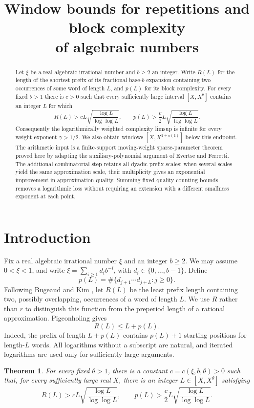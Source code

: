 \documentclass[11pt]{article}
\title{Window bounds for repetitions and block complexity\\of algebraic numbers}
\author{}\date{}
\numberwithin{equation}{section}
\newtheorem{theorem}{Theorem}[section]
\theoremstyle{remark}\newtheorem{remark}[theorem]{Remark}
\begin{document}
\maketitle
\begin{abstract}
Let $\xi$ be a real algebraic irrational number and $b\ge2$ an integer.
Write $R(L)$ for the length of the shortest prefix of its fractional
base-$b$ expansion containing two occurrences of some word of length $L$,
and $p(L)$ for its block complexity. For every fixed $\theta>1$ there is
$c>0$ such that every sufficiently large interval $[X,X^\theta]$ contains
an integer $L$ for which
\[
 R(L)>cL\sqrt{\frac{\log L}{\log\log L}},\qquad
 p(L)>\frac c2L\sqrt{\frac{\log L}{\log\log L}}.
\]
Consequently the logarithmically weighted complexity limsup is infinite
for every weight exponent $\gamma>1/2$. We also obtain windows
$[X,X^{1+o(1)}]$ below this endpoint. The arithmetic input is a
finite-support moving-weight sparse-parameter theorem proved here by
adapting the auxiliary-polynomial argument of Evertse and Ferretti.
The additional combinatorial step retains all dyadic prefix scales:
when several scales yield the same approximation scale, their
multiplicity gives an exponential improvement in approximation quality.
Summing fixed-quality counting bounds removes a logarithmic loss without
requiring an extension with a different smallness exponent at each point.
\end{abstract}

\section{Introduction}
Fix a real algebraic irrational number $\xi$ and an integer $b\ge2$.
We may assume $0<\xi<1$, and write
$\xi=\sum_{i\ge1}d_ib^{-i}$, with $d_i\in\{0,\ldots,b-1\}$.
Define
\[
 p(L)=\#\{d_{j+1}\cdots d_{j+L}:j\ge0\}.
\]
Following Bugeaud and Kim \cite{BK19}, let $R(L)$ be the least prefix
length containing two, possibly overlapping, occurrences of a word
of length $L$. We use $R$ rather than $r$ to distinguish this function
from the preperiod length of a rational approximation. Pigeonholing gives
\begin{equation}\label{eq:RvsP}
 R(L)\le L+p(L).
\end{equation}
Indeed, the prefix of length $L+p(L)$ contains $p(L)+1$ starting
positions for length-$L$ words. All logarithms without a subscript
are natural, and iterated logarithms are used only for sufficiently
large arguments.

\begin{theorem}\label{thm:main}
For every fixed $\theta>1$, there is a constant
$c=c(\xi,b,\theta)>0$ such that, for every sufficiently large real $X$,
there is an integer $L\in[X,X^\theta]$ satisfying
\begin{equation}\label{eq:main}
 R(L)>cL\sqrt{\frac{\log L}{\log\log L}},\qquad
 p(L)>\frac c2L\sqrt{\frac{\log L}{\log\log L}}.
\end{equation}
\end{theorem}
\end{document}
